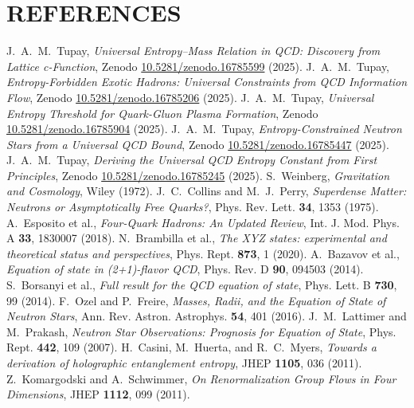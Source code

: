 \documentclass[aps,prd,onecolumn,nofootinbib,superscriptaddress]{revtex4-2}
\begin{document}
\section*{REFERENCES}
\begin{thebibliography}{99}

 J.~A.~M.~Tupay, \emph{Universal Entropy--Mass Relation in QCD: Discovery from Lattice c-Function}, Zenodo \href{https://doi.org/10.5281/zenodo.16785599}{10.5281/zenodo.16785599} (2025).
 J.~A.~M.~Tupay, \emph{Entropy-Forbidden Exotic Hadrons: Universal Constraints from QCD Information Flow}, Zenodo \href{https://doi.org/10.5281/zenodo.16785206}{10.5281/zenodo.16785206} (2025).
 J.~A.~M.~Tupay, \emph{Universal Entropy Threshold for Quark-Gluon Plasma Formation}, Zenodo \href{https://doi.org/10.5281/zenodo.16785904}{10.5281/zenodo.16785904} (2025).
 J.~A.~M.~Tupay, \emph{Entropy-Constrained Neutron Stars from a Universal QCD Bound}, Zenodo \href{https://doi.org/10.5281/zenodo.16785447}{10.5281/zenodo.16785447} (2025).
 J.~A.~M.~Tupay, \emph{Deriving the Universal QCD Entropy Constant from First Principles}, Zenodo \href{https://doi.org/10.5281/zenodo.16785245}{10.5281/zenodo.16785245} (2025).
 S.~Weinberg, \emph{Gravitation and Cosmology}, Wiley (1972).
 J.~C.~Collins and M.~J.~Perry, \emph{Superdense Matter: Neutrons or Asymptotically Free Quarks?}, Phys. Rev. Lett. \textbf{34}, 1353 (1975).
 A.~Esposito et al., \emph{Four-Quark Hadrons: An Updated Review}, Int. J. Mod. Phys. A \textbf{33}, 1830007 (2018).
 N.~Brambilla et al., \emph{The XYZ states: experimental and theoretical status and perspectives}, Phys. Rept. \textbf{873}, 1 (2020).
 A.~Bazavov et al., \emph{Equation of state in (2+1)-flavor QCD}, Phys. Rev. D \textbf{90}, 094503 (2014).
 S.~Borsanyi et al., \emph{Full result for the QCD equation of state}, Phys. Lett. B \textbf{730}, 99 (2014).
 F.~Ozel and P.~Freire, \emph{Masses, Radii, and the Equation of State of Neutron Stars}, Ann. Rev. Astron. Astrophys. \textbf{54}, 401 (2016).
 J.~M.~Lattimer and M.~Prakash, \emph{Neutron Star Observations: Prognosis for Equation of State}, Phys. Rept. \textbf{442}, 109 (2007).
 H.~Casini, M.~Huerta, and R.~C.~Myers, \emph{Towards a derivation of holographic entanglement entropy}, JHEP \textbf{1105}, 036 (2011).
 Z.~Komargodski and A.~Schwimmer, \emph{On Renormalization Group Flows in Four Dimensions}, JHEP \textbf{1112}, 099 (2011).

\end{thebibliography}
\end{document}
